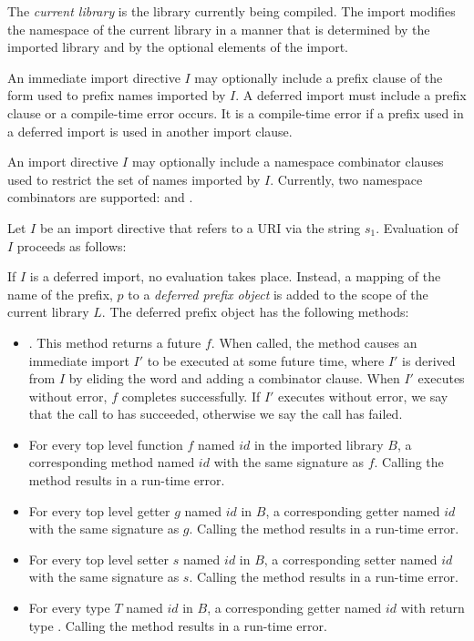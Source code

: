 \documentclass{article}
\begin{document}
\LMHash{}
The {\em current library} is the library currently being compiled.
The import modifies the namespace of the current library in a manner that is determined by the imported library and by the optional elements of the import.

\LMHash{}
An immediate import directive $I$ may optionally include a prefix clause of the form  used to prefix names imported by $I$.
A deferred import must include a prefix clause or a compile-time error occurs.
It is a compile-time error if a prefix used in a deferred import is used in another import clause.

\LMHash{}
An import directive $I$ may optionally include a namespace combinator clauses used to restrict the set of names imported by $I$.
Currently, two namespace combinators are supported: \HIDE{} and \SHOW{}.

\LMHash{}
Let $I$ be an import directive that refers to a URI via the string $s_1$.
Evaluation of $I$ proceeds as follows:

\LMHash{}
If $I$ is a deferred import, no evaluation takes place.
Instead, a mapping of the name of the prefix, $p$ to a {\em deferred prefix object} is added to the scope of the current library $L$.
The deferred prefix object has the following methods:

\begin{itemize}
\item {}.
This method returns a future $f$.
When called, the method causes an immediate import $I'$ to be executed at some future time, where $I'$ is derived from $I$ by eliding the word \DEFERRED{} and adding a \HIDE{}  combinator clause.
When $I'$ executes without error, $f$ completes successfully.
If $I'$ executes without error, we say that the call to  has succeeded, otherwise we say the call has failed.
\item For every top level function $f$ named $id$ in the imported library $B$, a corresponding method named $id$ with the same signature as $f$.
Calling the method results in a run-time error.
\item For every top level getter $g$ named $id$ in $B$, a corresponding getter named $id$ with the same signature as $g$.
Calling the method results in a run-time error.
\item For every top level setter $s$ named $id$ in $B$, a corresponding setter named $id$ with the same signature as $s$.
Calling the method results in a run-time error.
\item For every type $T$ named $id$ in $B$, a corresponding getter named $id$ with return type .
Calling the method results in a run-time error.
\end{itemize}
\end{document}
